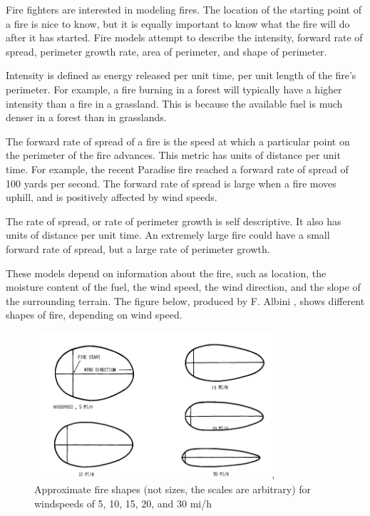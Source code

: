 \documentclass[12pt,journal,compsoc]{IEEEtran}
\begin{document}
Fire fighters are interested in modeling fires. The location of the starting point of a fire is nice to know, but it is equally important to know what the fire will do after it has started. Fire models attempt to describe the intensity, forward rate of spread, perimeter growth rate, area of perimeter, and shape of perimeter. 

Intensity is defined as energy released per unit time, per unit length of the fire’s perimeter. For example, a fire burning in a forest will typically have a higher intensity than a fire in a grassland. This is because the available fuel is much denser in a forest than in grasslands.

The forward rate of spread of a fire is the speed at which a particular point on the perimeter of the fire advances. This metric has units of distance per unit time. For example, the recent Paradise fire reached a forward rate of spread of 100 yards per second. The forward rate of spread is large when a fire moves uphill, and is positively affected by wind speeds.

The rate of spread, or rate of perimeter growth is self descriptive. It also has units of distance per unit time. An extremely large fire could have a small forward rate of spread, but a large rate of perimeter growth.

These models depend on information about the fire, such as location, the moisture content of the fuel, the wind speed, the wind direction, and the slope of the surrounding terrain. The figure below, produced by F. Albini \cite{estimating_wildfire}, shows different shapes of fire, depending on wind speed.

\begin{figure}[h!]
\hspace*{0cm}
\centering
\includegraphics[width=3.5in]{fire_shape.png}
\caption{Approximate fire shapes (not sizes, the scales are arbitrary) for windspeeds of 5, 10, 15, 20, and 30 mi/h \cite{estimating_wildfire}}
\label{maidenFlightPlot}
\end{figure}
\end{document}
